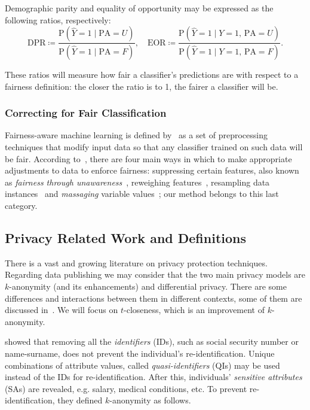 \documentclass[runningheads]{llncs}
\begin{document}
Demographic parity and equality of opportunity may be expressed as the following ratios, respectively:
\[
  \text{DPR} \coloneqq \frac
  {\text{P} \left( \hat{Y} = 1 \mid \text{PA} = U \right)}
  {\text{P} \left( \hat{Y} = 1 \mid \text{PA} = F \right)}, \quad
  \text{EOR} \coloneqq \frac
  {\text{P} \left( \hat{Y} = 1 \mid Y = 1,\, \text{PA} = U \right)}
  {\text{P} \left( \hat{Y} = 1 \mid Y = 1,\, \text{PA} = F \right)}.
\]

These ratios will measure how fair a classifier's predictions are with respect to a fairness definition: the closer the ratio is to 1, the fairer a classifier will be.

\subsubsection{Correcting for Fair Classification}

Fairness-aware machine learning is defined by~\cite{friedler2019comparative} as a set of preprocessing techniques that modify input data so that any classifier trained on such data will be fair. According to~\cite{kamiran2012data}, there are four main ways in which to make appropriate adjustments to data to enforce fairness: suppressing certain features, also known as \emph{fairness through unawareness}~\cite{gajane2017formalizing},  reweighing features~\cite{krasanakis2018adaptive}, resampling data instances~\cite{rubin1973use,kamiran2010classification,salimi2019capuchin,zelaya2019parametrised} and \emph{massaging} variable values~\cite{chiappa2018path}; our method belongs to this last category.

\subsection{Privacy Related Work and Definitions}

There is a vast and growing literature on privacy protection techniques. 
Regarding data publishing we may consider that the two main privacy models are $k$-anonymity (and its enhancements) and differential privacy. There are some differences and interactions between them in different contexts, some of them are discussed in~\cite{Salas:2018}. We will focus on $t$-closeness, which is an improvement of $k$-anonymity.

\cite{Samarati:2001,Sweeney:2002} showed that removing all the \emph{identifiers} (IDs), such as social security number or name-surname, does not prevent the individual's re-identification. Unique combinations of attribute values, called \emph{quasi-identifiers} (QIs) may be used instead of the IDs for re-identification. After this, individuals' \emph{sensitive attributes} (SAs) are revealed, e.g. salary, medical conditions, etc. To prevent re-identification, they defined $k$-anonymity as follows.
\end{document}
